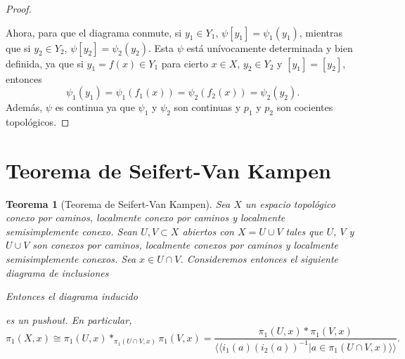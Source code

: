 \documentclass[12pt,a4paper]{book}
\newtheorem{thm}{Teorema}[section]
\theoremstyle{definition} \newtheorem{defn}[thm]{Definición}
\theoremstyle{definition} \newtheorem{ejemplo}[thm]{Ejemplo}
\theoremstyle{definition} \newtheorem{ejercicio}[thm]{Ejercicio}
\theoremstyle{remark} \newtheorem*{obs}{Observación}
\def\gf{\pi_1}
\begin{document}
\begin{proof}
\begin{center}
\begin{tikzcd}
    \end{tikzcd}
  \end{center}
  Ahora, para que el diagrama conmute, si $y_1 \in Y_1$, $\psi[y_1]=\psi_1(y_1)$, mientras que si $y_2 \in Y_2$, $\psi[y_2]=\psi_2(y_2)$. Esta $\psi$ está unívocamente determinada y bien definida, ya que si $y_1=f(x)\in Y_1$ para cierto $x \in X$, $y_2 \in Y_2$ y $[y_1]=[y_2]$, entonces 
  \begin{equation*}
    \psi_1(y_1)=\psi_1(f_1(x))=\psi_2(f_2(x))=\psi_2(y_2).	
  \end{equation*}
  Además, $\psi$ es continua ya que $\psi_1$ y $\psi_2$ son continuas y $p_1$ y $p_2$ son cocientes topológicos.
\end{proof}

\section{Teorema de Seifert-Van Kampen}
\begin{thm}[Teorema de Seifert-Van Kampen]
 Sea $X$ un espacio topológico conexo por caminos, localmente conexo por caminos y localmente semisimplemente conexo. Sean $U,V\subset X$ abiertos con $X=U\cup V$ tales que $U$, $V$ y $U\cup V$ son conexos por caminos, localmente conexos por caminos y localmente semisimplemente conexos. Sea $x\in U\cap V$. Consideremos entonces el siguiente diagrama de inclusiones
 \begin{center}
 \end{center}
 Entonces el diagrama inducido
 \begin{center}
 \end{center}
 es un pushout. En particular, $$\gf(X,x)\cong \gf(U,x)*_{\gf(U\cap V,x)}\gf(V,x)=\frac{\gf(U,x)*\gf(V,x)}{\langle \langle i_1(a)(i_2(a))^{-1}|a\in \gf(U\cap V,x)\rangle \rangle}.$$
\end{thm}
\end{document}
